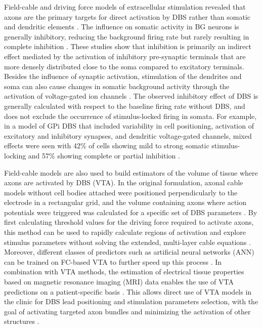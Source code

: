 %
Field-cable and driving force models of extracellular stimulation revealed that axons are the primary
targets for direct activation by DBS rather than somatic and dendritic elements
\cite{nowak_axons_1998,nowak_axons_1998-1,mcintyre_excitation_1999,mcintyre_selective_2000,mcintyre_cellular_2004,mcintyre_electric_2004,yousif_spatiotemporal_2012}.
The influence on somatic activity in BG neurons is generally inhibitory,
reducing the background firing rate but rarely resulting in complete inhibition
\cite{mcintyre_cellular_2004,miocinovic_computational_2006,johnson_quantifying_2008}.
%
These studies show that inhibition is primarily an indirect effect mediated by the activation
of inhibitory pre-synaptic terminals that are more densely distributed close to the soma
compared to excitatory terminals.
Besides the influence of synaptic activation, stimulation of the dendrites and soma
can also cause changes in somatic background activity through the activation of voltage-gated ion channels \cite{johnson_quantifying_2008,rattay_which_2010,yousif_evaluating_2010,yousif_spatiotemporal_2012}.
The observed inhibitory effect of DBS is generally calculated with respect to the baseline
firing rate without DBS, and does not exclude the occurrence of stimulus-locked
firing in somata. For example, in a model of GPi DBS that included variability in cell positioning,
activation of excitatory and inhibitory synapses, and dendritic voltage-gated channels,
mixed effects were seen with 42\% of cells showing mild to strong somatic stimulus-locking
and 57\% showing complete or partial inhibition \cite{johnson_quantifying_2008}.

%
%
Field-cable models are also used to build estimators of the volume of tissue
where axons are activated by DBS (VTA). In the original formulation, axonal
cable models without cell bodies attached were positioned perpendicularly
to the electrode in a rectangular grid, and the volume containing axons
where action potentials were triggered was calculated for a specific
set of DBS parameters \cite{butson_role_2006}. By first calculating threshold
values for the driving force required to activate axons, this method can be used
to rapidly calculate regions of activation and explore stimulus parameters
without solving the extended, multi-layer cable equations
\cite{butson_role_2006,butson_patient-specific_2007}. Moreover, different
classes of predictors such as artificial neural networks (ANN) can be
trained on FC-based VTA to further speed up this process \cite{chaturvedi_artificial_2013}.
%
In combination with VTA methods, the estimation of electrical tissue properties
based on magnetic resonance imaging (MRI) data enables the use of VTA predictions
on a patient-specific basis \cite{butson_patient-specific_2007,astrom_method_2009}.
This allows direct use of VTA models in the clinic for DBS lead positioning
and stimulation parameters selection, with the goal of activating targeted
axon bundles and minimizing the activation of other structures
\cite{sakas_stimexplorer_2007,sakas_cicerone_2007,frankemolle_reversing_2010,noecker_stimvision_2018}.
%
%

